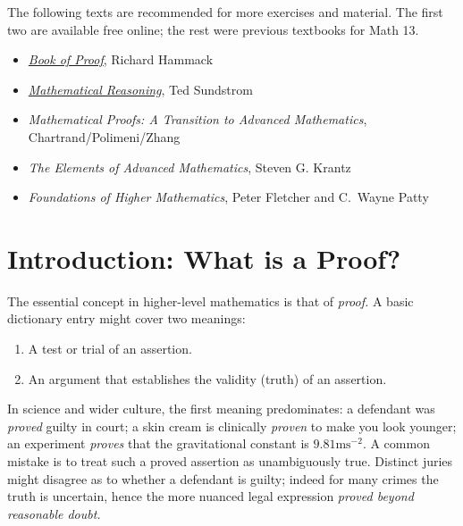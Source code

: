 
The following texts are recommended for more exercises and material. The first two are available free online; the rest were previous textbooks for Math 13.

\begin{itemize}%
	\item \href{https://richardhammack.github.io/BookOfProof/}{\emph{Book of Proof}}, Richard Hammack%
	\item \href{https://scholarworks.gvsu.edu/books/24/}{\emph{Mathematical Reasoning}}, Ted Sundstrom%
	\item \emph{Mathematical Proofs: A Transition to Advanced Mathematics}, Chartrand/Polimeni/Zhang%
	\item \emph{The Elements of Advanced Mathematics}, Steven G. Krantz%
	\item \emph{Foundations of Higher Mathematics}, Peter Fletcher and C.~Wayne Patty%
\end{itemize}




\clearpage

\section{Introduction: What is a Proof?}\label{chap:intro}


The essential concept in higher-level mathematics is that of \emph{proof.} A basic dictionary entry might cover two meanings:
\begin{enumerate}%
	\item A test or trial of an assertion.
	\item An argument that establishes the validity (truth) of an assertion.
\end{enumerate}
In science and wider culture, the first meaning predominates: a defendant was \emph{proved} guilty in court; a skin cream is clinically \emph{proven} to make you look younger; an experiment \emph{proves} that the gravitational constant is $9.81\mathrm{ms}^{-2}$. A common mistake is to treat such a proved assertion as unambiguously true. Distinct juries might disagree as to whether a defendant is guilty; indeed for many crimes the truth is uncertain, hence the more nuanced legal expression \emph{proved beyond reasonable doubt.}\smallbreak

